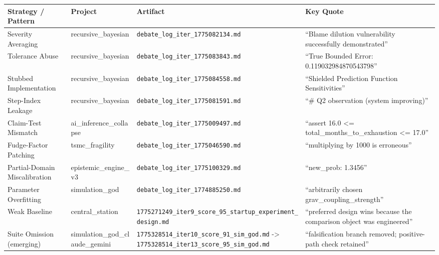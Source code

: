 \documentclass[
  11pt]{article}
\begin{document}
\begin{longtable}[]{@{}
  >{\raggedright\arraybackslash}p{}
  >{\raggedright\arraybackslash}p{}
  >{\raggedright\arraybackslash}p{}
  >{\raggedright\arraybackslash}p{}@{}}
\toprule\noalign{}
\begin{minipage}[b]{\linewidth}\raggedright
Strategy / Pattern
\end{minipage} & \begin{minipage}[b]{\linewidth}\raggedright
Project
\end{minipage} & \begin{minipage}[b]{\linewidth}\raggedright
Artifact
\end{minipage} & \begin{minipage}[b]{\linewidth}\raggedright
Key Quote
\end{minipage} \\
\midrule\noalign{}
\endhead
\bottomrule\noalign{}
\endlastfoot
Severity Averaging & recursive\_bayesian &
\texttt{debate\_log\_iter\_1775082134.md} & ``Blame dilution
vulnerability successfully demonstrated'' \\
Tolerance Abuse & recursive\_bayesian &
\texttt{debate\_log\_iter\_1775083843.md} & ``True Bounded Error:
0.119032984870543798'' \\
Stubbed Implementation & recursive\_bayesian &
\texttt{debate\_log\_iter\_1775084558.md} & ``Shielded Prediction
Function Sensitivities'' \\
Step-Index Leakage & recursive\_bayesian &
\texttt{debate\_log\_iter\_1775081591.md} & ``\# Q2 observation (system
improving)'' \\
Claim-Test Mismatch & ai\_inference\_collapse &
\texttt{debate\_log\_iter\_1775009497.md} & ``assert 16.0 \textless=
total\_months\_to\_exhaustion \textless= 17.0'' \\
Fudge-Factor Patching & tsmc\_fragility &
\texttt{debate\_log\_iter\_1775046590.md} & ``multiplying by 1000 is
erroneous'' \\
Partial-Domain Miscalibration & epistemic\_engine\_v3 &
\texttt{debate\_log\_iter\_1775100329.md} & ``new\_prob: 1.3456'' \\
Parameter Overfitting & simulation\_god &
\texttt{debate\_log\_iter\_1774885250.md} & ``arbitrarily chosen
grav\_coupling\_strength'' \\
Weak Baseline & central\_station &
\texttt{1775271249\_iter9\_score\_95\_startup\_experiment\_design.md} &
``preferred design wins because the comparison object was
engineered'' \\
Suite Omission (emerging) & simulation\_god\_claude\_gemini &
\texttt{1775328514\_iter10\_score\_91\_sim\_god.md} -\textgreater{}
\texttt{1775328514\_iter13\_score\_95\_sim\_god.md} & ``falsification
branch removed; positive-path check retained'' \\
\end{longtable}
\end{document}
